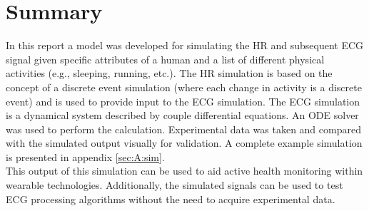 \documentclass[paper=a4, fontsize=11pt]{scrartcl}
\numberwithin{equation}{section}		%
\numberwithin{figure}{section}			%
\numberwithin{table}{section}		    %
\begin{document}
\section{Summary}
In this report a model was developed for simulating the HR and subsequent ECG signal given 
specific attributes of a human and a list of different physical activities (e.g., sleeping, 
running, etc.). The HR simulation is based on the concept of a discrete event simulation (where
each change in activity is a discrete event) and is used to provide input to the ECG simulation.
The ECG simulation is a dynamical system described by couple differential equations. An ODE
solver was used to perform the calculation. Experimental data was taken and compared with the 
simulated output visually for validation. A complete example simulation is presented in appendix 
\ref{sec:A:sim}. \\

This output of this simulation can be used to aid active health monitoring within wearable
technologies. Additionally, the simulated signals can be used to test ECG processing algorithms
without the need to acquire experimental data. 
\end{document}
